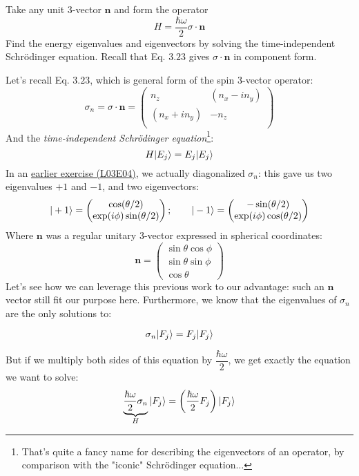 \documentclass[solutions.tex]{subfiles}
\begin{document}
\maketitle
\begin{exercise} Take any unit $3$-vector $\bm{n}$ and form
the operator
\[
	H = \frac{\hbar\omega}2\sigma\cdot\bm{n}
\]
Find the energy eigenvalues and eigenvectors by solving the
time-independent Schr\"odinger equation. Recall that Eq. $3.23$
gives $\sigma\cdot\bm{n}$ in component form.
\end{exercise}
Let's recall Eq. $3.23$, which is general form of the spin $3$-vector operator:
\[
	\sigma_n = \sigma\cdot\bm{n} = \begin{pmatrix}
		n_z          & (n_x - in_y) \\
		(n_x + in_y) & -n_z         \\
	\end{pmatrix}
\]
And the \textit{time-independent Schr\"odinger equation}\footnote{That's
quite a fancy name for describing the eigenvectors of an
operator, by comparison with the "iconic" Schr\"odinger equation$\ldots$}:
\[
	H|E_j\rangle = E_j|E_j\rangle
\]
In an \href{https://github.com/mbivert/ttm/blob/master/qm/L03E04.pdf}{earlier
exercise (L03E04)}, we actually diagonalized $\sigma_n$: this gave us two
eigenvalues $+1$ and $-1$, and two eigenvectors:
\[
	|+1\rangle = \begin{pmatrix}
		\cos(\theta/2) \\
		\exp(i\phi)\sin(\theta/2) \\
	\end{pmatrix};\qquad
	|-1\rangle = \begin{pmatrix}
		-\sin(\theta/2) \\
		\exp(i\phi)\cos(\theta/2) \\
	\end{pmatrix}
\]
Where $\bm{n}$ was a regular unitary $3$-vector expressed in spherical
coordinates:
\[
	\bm{n} = \begin{pmatrix}
		\sin\theta\cos\phi \\
		\sin\theta\sin\phi \\
		\cos\theta
	\end{pmatrix}
\]
Let's see how we can leverage this previous work to our advantage:
such an $\bm{n}$ vector still fit our purpose here. Furthermore,
we know that the eigenvalues of $\sigma_n$ are the only solutions to:

\[ \sigma_n|F_j\rangle = F_j|F_j\rangle \]

But if we multiply both sides of this equation by $\dfrac{\hbar\omega}2$,
we get exactly the equation we want to solve:
\[
	\underbrace{\frac{\hbar\omega}2\sigma_n}_{H}|F_j\rangle =
		\left(\frac{\hbar\omega}2F_j\right)|F_j\rangle
\]
\end{document}
